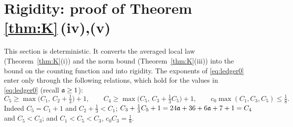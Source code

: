 \section{Rigidity: proof of Theorem \ref{thm:K}\,(iv),(v)}\label{sec:rig}
This section is deterministic. It converts the averaged local law (Theorem~\ref{thm:K}(i)) and the norm bound (Theorem~\ref{thm:K}(iii)) into the bound on the counting function and into rigidity.
The exponents of \eqref{eq:ledger0} enter only through the following relations, which hold for the values in \eqref{eq:ledger0} (recall $\mathfrak{a}\ge1$):
\begin{equation}\label{eq:ledgerrel}
 C_5\ge\max\big(C_1,\,C_2+\tfrac13\big)+1,\qquad C_4\ge\max\big(C_5,\,C_3+\tfrac13C_5\big)+1,\qquad c_0\max(C_1,C_3,C_5)\le\tfrac18 .
\end{equation}
Indeed $C_5=C_1+1$ and $C_2+\frac13<C_1$; $C_3+\frac13C_5+1=24\mathfrak{a}+36+6\mathfrak{a}+7+1=C_4$ and $C_5<C_3$; and $C_1<C_5<C_3$, $c_0C_3=\frac18$.

